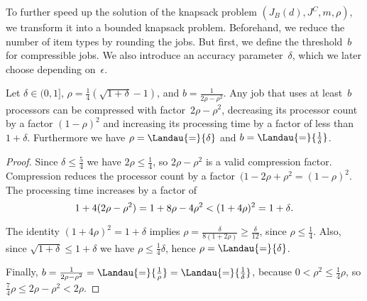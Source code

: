 To further speed up the solution of the knapsack problem $(J_B(d), J^C, m, \rho)$,
we transform it into a bounded knapsack problem.
Beforehand, we reduce the number of item types by rounding the jobs.
But first, we define the threshold~$b$ for compressible jobs.
We also introduce an accuracy parameter~$\delta$, which we later choose depending on~$\epsilon$.

\begin{lemma}
  \label{lemma:compress-twice}
  Let $\delta \in (0,1]$, $\rho = \frac{1}{4}(\sqrt{1+\delta}-1)$, and $b = \frac{1}{2\rho - \rho^2}$.
  Any job that uses at least~$b$ processors can be compressed with factor~$2\rho - \rho^2$,
  decreasing its processor count by a factor $(1-\rho)^2$
  and increasing its processing time by a factor of less than~$1 + \delta$.
  Furthermore we have $\rho = \Landau{=}{\delta}$ and $b = \Landau{=}{\frac{1}{\delta}}$.
\end{lemma}

\begin{proof}
  Since $\delta \leq \frac{5}{4}$ we have $2\rho \leq \frac{1}{4}$, so $2\rho - \rho^2$ is a valid compression factor.
  Compression reduces the processor count by a factor~$(1 - 2\rho + \rho^2 = (1-\rho)^2$.
  The processing time increases by a factor of
  \begin{equation}
    1 + 4(2\rho - \rho^2) = 1 + 8\rho - 4\rho^2 < (1 + 4\rho)^2 = 1 + \delta \text{.}
  \end{equation}    
  
  The identity $(1+4\rho)^2 = 1 + \delta$ implies
  $\rho = \frac{\delta}{8(1+2\rho)} \geq \frac{\delta}{12}$,
  since $\rho \leq \frac{1}{4}$.  
  Also, since $\sqrt{1+\delta} \leq 1+\delta$ we have $\rho \leq \frac{1}{4}\delta$,
  hence $\rho = \Landau{=}{\delta}$.

  Finally, $b = \frac{1}{2\rho - \rho^2} = \Landau{=}{\frac{1}{\rho}} = \Landau{=}{\frac{1}{\delta}}$,
  because $0 < \rho^2 \leq \frac{1}{4}\rho$,
  so $\frac{7}{4} \rho \leq 2\rho - \rho^2 < 2 \rho$.
\end{proof}

